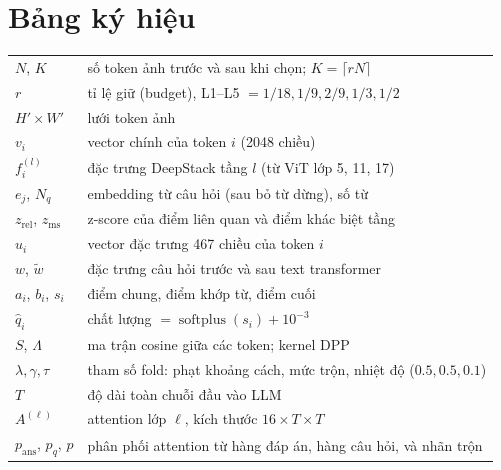 \documentclass[11pt,a4paper]{article}
\newcommand{\qhat}{\hat{q}}
\newcommand{\softplus}{\operatorname{softplus}}
\begin{document}
\section{Bảng ký hiệu}
\begin{center}
\small
\begin{tabular}{@{}ll@{}}
\toprule
$N$, $K$ & số token ảnh trước và sau khi chọn; $K=\lceil rN\rceil$\\
$r$ & tỉ lệ giữ (budget), L1--L5 $=1/18,1/9,2/9,1/3,1/2$\\
$H'\times W'$ & lưới token ảnh\\
$v_i$ & vector chính của token $i$ (2048 chiều)\\
$f_i^{(l)}$ & đặc trưng DeepStack tầng $l$ (từ ViT lớp 5, 11, 17)\\
$e_j$, $N_q$ & embedding từ câu hỏi (sau bỏ từ dừng), số từ\\
$z_\text{rel}$, $z_\text{ms}$ & z-score của điểm liên quan và điểm khác biệt tầng\\
$u_i$ & vector đặc trưng 467 chiều của token $i$\\
$w$, $\tilde w$ & đặc trưng câu hỏi trước và sau text transformer\\
$a_i$, $b_i$, $s_i$ & điểm chung, điểm khớp từ, điểm cuối\\
$\qhat_i$ & chất lượng $=\softplus(s_i)+10^{-3}$\\
$S$, $\Lambda$ & ma trận cosine giữa các token; kernel DPP\\
$\lambda,\gamma,\tau$ & tham số fold: phạt khoảng cách, mức trộn, nhiệt độ ($0.5, 0.5, 0.1$)\\
$T$ & độ dài toàn chuỗi đầu vào LLM\\
$A^{(\ell)}$ & attention lớp $\ell$, kích thước $16\times T\times T$\\
$p_\text{ans}$, $p_q$, $p$ & phân phối attention từ hàng đáp án, hàng câu hỏi, và nhãn trộn\\
\bottomrule
\end{tabular}
\end{center}
\end{document}
